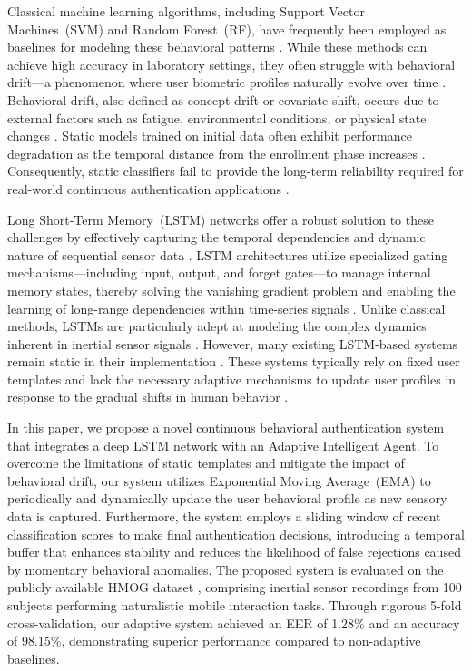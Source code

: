 \documentclass[3p,times,procedia]{elsarticle}
\begin{document}
Classical machine learning algorithms, including Support Vector
Machines~(SVM) and Random Forest~(RF), have frequently been
employed as baselines for modeling these behavioral patterns
\cite{incel_dakota_2021}. While these methods can achieve high accuracy
in laboratory settings, they often struggle with behavioral
drift---a phenomenon where user biometric profiles naturally
evolve over time \cite{verma_data-driven_2022}. Behavioral drift, also
defined as concept drift or covariate shift, occurs due to
external factors such as fatigue, environmental conditions, or
physical state changes \cite{incel_dakota_2021}. Static models trained
on initial data often exhibit performance degradation as the
temporal distance from the enrollment phase increases
\cite{frank_touchalytics_2013}. Consequently, static classifiers fail to
provide the long-term reliability required for real-world
continuous authentication applications \cite{stylios_behavioral_2021}.

Long Short-Term Memory~(LSTM) networks offer a robust solution
to these challenges by effectively capturing the temporal
dependencies and dynamic nature of sequential sensor data
\cite{cao_user_2022}. LSTM architectures utilize specialized gating
mechanisms---including input, output, and forget gates---to
manage internal memory states, thereby solving the vanishing
gradient problem and enabling the learning of long-range
dependencies within time-series signals \cite{hochreiter_long_1997}.
Unlike classical methods, LSTMs are particularly adept at
modeling the complex dynamics inherent in inertial sensor
signals \cite{zeng_gait-based_2021}. However, many existing LSTM-based
systems remain static in their implementation \cite{stylios_behavioral_2021}.
These systems typically rely on fixed user templates and lack
the necessary adaptive mechanisms to update user profiles in
response to the gradual shifts in human behavior
\cite{abuhamad_autosen_2020}.

In this paper, we propose a novel continuous behavioral
authentication system that integrates a deep LSTM network with
an Adaptive Intelligent Agent. To overcome the limitations of
static templates and mitigate the impact of behavioral drift,
our system utilizes Exponential Moving Average~(EMA) to
periodically and dynamically update the user behavioral profile
as new sensory data is captured. Furthermore, the system
employs a sliding window of recent classification scores to
make final authentication decisions, introducing a temporal
buffer that enhances stability and reduces the likelihood of
false rejections caused by momentary behavioral anomalies. The
proposed system is evaluated on the publicly available HMOG
dataset \cite{sitova_hmog_2016}, comprising inertial sensor recordings
from 100 subjects performing naturalistic mobile interaction
tasks. Through rigorous 5-fold cross-validation, our adaptive
system achieved an EER of 1.28\% and an accuracy of 98.15\%,
demonstrating superior performance compared to non-adaptive
baselines.
\end{document}
